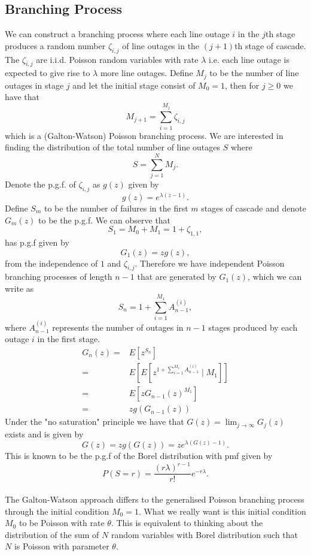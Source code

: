 \documentclass{article}
\begin{document}
\subsection{Branching Process}

We can construct a branching process where each line outage $i$ in the $j$th stage produces a random number $\zeta_{i,j}$ of line outages in the $(j+1)$th stage of cascade. The $\zeta_{i,j}$ are i.i.d. Poisson random variables with rate $\lambda$ i.e. each line outage is expected to give rise to $\lambda$ more line outages. Define $M_j$ to be the number of line outages in stage $j$ and let the initial stage consist of $M_0=1$, then for $j\ge 0$ we have that
\[M_{j+1} = \sum_{i=1}^{M_j} \zeta_{i,j}\]
which is a (Galton-Watson) Poisson branching process. We are interested in finding the distribution of the total number of line outages $S$ where 
\[S = \sum_{j=1}^{N} M_j.\]
Denote the p.g.f. of $\zeta_{i,j}$ as $g(z)$ given by
\[g(z) = e^{\lambda(z-1)}.\]
Define $S_m$ to be the number of failures in the first $m$ stages of cascade and denote $G_m(z)$ to be the p.g.f. We can observe that
\[S_1 = M_0+M_1 = 1+\zeta_{1,1},\]
has p.g.f given by
\[G_1(z) = zg(z),\]	
from the independence of $1$ and $\zeta_{i,j}$. Therefore we have independent Poisson branching processes of length $n-1$ that are generated by $G_1(z)$, which we can write as
\[S_n = 1+ \sum_{i=1}^{M_1} A_{n-1}^{(i)},\]
where $A_{n-1}^{(i)}$ represents the number of outages in $n-1$ stages produced by each outage $i$ in the first stage.
\[\begin{aligned} G_n(z) =& E\left[z^{S_n}\right]\\
=& E\left[ E\left[ z^{1+ \sum_{i=1}^{M_1} A_{n-1}^{(i)}}\mid M_1 \right] \right] \\
=& E\left[ zG_{n-1}(z)^{M_1}\right] \\
=& zg(G_{n-1}(z))
\end{aligned}\]
Under the "no saturation" principle we have that $G(z) = \lim_{j\to \infty} G_j(z)$ exists and is given by
\[G(z) = zg(G(z)) = ze^{\lambda(G(z)-1)}.\]
This is known to be the p.g.f of the Borel distribution with pmf given by
\[P(S=r) = \frac{(r\lambda)^{r-1}}{r!}e^{-r\lambda}.\] \\

The Galton-Watson approach differs to the generalised Poisson branching process through the initial condition $M_0=1$. What we really want is this initial condition $M_0$ to be Poisson with rate $\theta$. This is equivalent to thinking about the distribution of the sum of $N$ random variables with Borel distribution such that $N$ is Poisson with parameter $\theta$. \\
\end{document}
